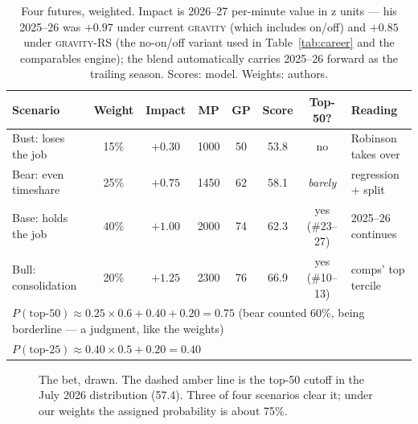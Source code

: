 \documentclass[11pt]{article}
\newcommand{\gravity}{\textsc{gravity}}
\begin{document}
\begin{table}[h]
\centering\small
\caption{Four futures, weighted. Impact is 2026--27 per-minute value in z units --- his
2025--26 was $+0.97$ under current \gravity{} (which includes on/off) and $+0.85$ under
\gravity-RS (the no-on/off variant used in Table~\ref{tab:career} and the comparables
engine); the blend automatically carries 2025--26 forward as the trailing season.
Scores: model. Weights: authors.}
\begin{tabular}{lccccccl}
\toprule
Scenario & Weight & Impact & MP & GP & Score & Top-50? & Reading \\
\midrule
Bust: loses the job & 15\% & $+0.30$ & 1000 & 50 & 53.8 & no & Robinson takes over \\
Bear: even timeshare & 25\% & $+0.75$ & 1450 & 62 & 58.1 & \emph{barely} & regression + split \\
Base: holds the job & 40\% & $+1.00$ & 2000 & 74 & 62.3 & yes (\#23--27) & 2025--26 continues \\
Bull: consolidation & 20\% & $+1.25$ & 2300 & 76 & 66.9 & yes (\#10--13) & comps' top tercile \\
\midrule
\multicolumn{8}{l}{$P(\text{top-50}) \approx 0.25{\times}0.6 + 0.40 + 0.20 =
\mathbf{0.75}$ \quad (bear counted 60\%, being borderline --- a judgment, like the weights)} \\
\multicolumn{8}{l}{$P(\text{top-25}) \approx 0.40{\times}0.5 + 0.20 = \mathbf{0.40}$} \\
\bottomrule
\end{tabular}
\label{tab:scenarios}
\end{table}

\begin{figure}[h]
\centering
{}
\caption{The bet, drawn. The dashed amber line is the top-50 cutoff in the July 2026
distribution (57.4). Three of four scenarios clear it; under our weights the assigned
probability is about 75\%.}
\label{fig:scen}
\end{figure}
\end{document}
